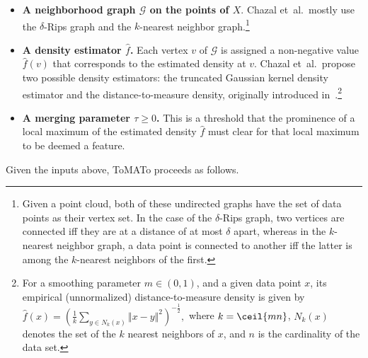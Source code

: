 \documentclass[10pt]{article} %
\theoremstyle{plain}
\newcommand{\GG}{\mathcal{G}}
\newcommand{\tom}{ToMATo\xspace}
\begin{document}
\begin{itemize}[nolistsep]
\item {\bf A neighborhood graph \(\GG\) on the points of \(X\)}. Chazal et~al.\ mostly use the $\delta$-Rips graph and the \(k\)-nearest neighbor graph.\footnote{Given a point cloud, both of these undirected graphs have the set of data points as their vertex set. In the case of the \(\delta\)-Rips graph, two vertices are connected iff they are at a distance of at most \(\delta\) apart, whereas in the \(k\)-nearest neighbor graph, a data point is connected to another iff the latter is among the \(k\)-nearest neighbors of the first.}
\item {\bf A density estimator $\hat{f}$.} Each vertex $v$ of \(\GG\) is assigned a non-negative value $\hat{f}(v)$ that corresponds to the estimated density at $v$. Chazal et~al.\ propose two possible density estimators: the truncated Gaussian kernel density estimator and the distance-to-measure density, originally introduced in~\citet{biau:dtm_density}.\footnote{For a smoothing parameter \(m\in(0,1)\), and a given data point \(x\), its empirical (unnormalized) distance-to-measure density is given by \(\hat{f}(x)=\left(\frac{1}{k}\sum_{y\in N_{k}(x)}\Vert x-y\Vert^{2}\right)^{-\frac{1}{2}},
\) where \(k=\ceil{mn}\), \(N_{k}(x)\) denotes the set of the \(k\) nearest neighbors of \(x\), and \(n\) is the cardinality of the data set.}
\item {\bf A merging parameter $\tau\geq 0$.} This is a threshold that the prominence of a local maximum of the estimated density \(\hat{f}\) must clear for that local maximum to be deemed a feature.
\end{itemize}

Given the inputs above, \tom proceeds as follows.
\end{document}
